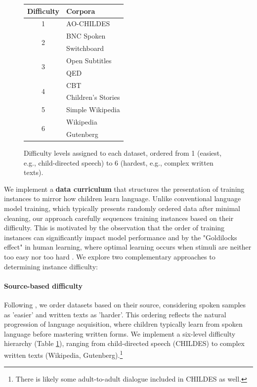 \begin{figure}    
    \centering
    \small
    \renewcommand{\arraystretch}{1}
    \begin{tabular}{cl}
    \toprule
    \textbf{Difficulty} & \textbf{Corpora} \\
    \midrule
    1 & AO-CHILDES \\
    \midrule
    \multirow{2}{*}{2} & BNC Spoken \\
                           & Switchboard \\
    \midrule
    \multirow{2}{*}{3} & Open Subtitles \\
                           & QED \\
    \midrule
    \multirow{2}{*}{4} & CBT \\
                           & Children's Stories \\
    \midrule
    5 & Simple Wikipedia \\
    \midrule
    \multirow{2}{*}{6} & Wikipedia \\
                           & Gutenberg \\
    \bottomrule
    \end{tabular}
    \caption{\label{tbl:source_order} Difficulty levels assigned to each dataset, ordered from 1 (easiest, e.g., child-directed speech) to 6 (hardest, e.g., complex written texts).}
\end{figure}

We implement a \textbf{data curriculum} that structures the presentation of training instances to mirror how children learn language. Unlike conventional language model training, which typically presents randomly ordered data after minimal cleaning, our approach carefully sequences training instances based on their difficulty. This is motivated by the observation that the order of training instances can significantly impact model performance \citep{schluter2018data} and by the "Goldilocks effect" in human learning, where optimal learning occurs when stimuli are neither too easy nor too hard \cite{kidd2012goldilocks}. We explore two complementary approaches to determining instance difficulty:

\paragraph{Source-based difficulty} Following \citet{huebner2021babyberta}, we order datasets based on their source, considering spoken samples as 'easier' and written texts as 'harder'. This ordering reflects the natural progression of language acquisition, where children typically learn from spoken language before mastering written forms. We implement a six-level difficulty hierarchy (Table \ref{tbl:source_order}), ranging from child-directed speech (CHILDES) to complex written texts (Wikipedia, Gutenberg).\footnote{There is likely some adult-to-adult dialogue included in CHILDES as well.}

